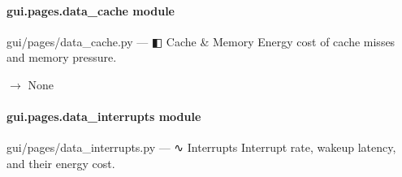 \documentclass[letterpaper,10pt,english]{sphinxmanual}
\begin{document}
\begin{fulllineitems}
\label{\detokenize{gui.pages.cpu:gui.pages.cpu.render}}
\pysigstartsignatures
\pysiglinewithargsret
{}
{}
{}
\pysigstopsignatures
\end{fulllineitems}


\sphinxstepscope


\paragraph{gui.pages.data\_cache module}
\label{\detokenize{gui.pages.data_cache:module-gui.pages.data_cache}}\label{\detokenize{gui.pages.data_cache:gui-pages-data-cache-module}}\label{\detokenize{gui.pages.data_cache::doc}}
\sphinxAtStartPar
gui/pages/data\_cache.py  —  ◧  Cache \& Memory
Energy cost of cache misses and memory pressure.

\begin{fulllineitems}
\label{\detokenize{gui.pages.data_cache:gui.pages.data_cache.render}}
\pysigstartsignatures
\pysiglinewithargsret
{}
{}
{{ $\rightarrow$ None}}
\pysigstopsignatures
\end{fulllineitems}


\sphinxstepscope


\paragraph{gui.pages.data\_interrupts module}
\label{\detokenize{gui.pages.data_interrupts:module-gui.pages.data_interrupts}}\label{\detokenize{gui.pages.data_interrupts:gui-pages-data-interrupts-module}}\label{\detokenize{gui.pages.data_interrupts::doc}}
\sphinxAtStartPar
gui/pages/data\_interrupts.py  —  ∿  Interrupts
Interrupt rate, wakeup latency, and their energy cost.
\end{document}
